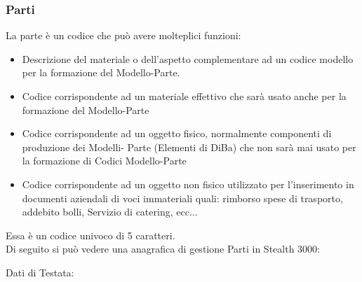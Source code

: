 \subsubsection{Parti}
La parte è un codice che può avere molteplici funzioni:
\begin{itemize}
\item Descrizione del materiale o dell’aspetto complementare ad un codice modello per la formazione del Modello-Parte.

\item Codice corrispondente ad un materiale effettivo che sarà usato anche per la formazione del Modello-Parte

\item Codice corrispondente ad un oggetto fisico, normalmente componenti di produzione dei Modelli- Parte (Elementi di DiBa) che non sarà mai usato per la formazione di Codici Modello-Parte

\item Codice corrispondente ad un oggetto non fisico utilizzato per l’inserimento in documenti aziendali di voci immateriali quali: rimborso spese di trasporto, addebito bolli, Servizio di catering, ecc...
\end{itemize}
Essa è un codice univoco di 5 caratteri.\\
Di seguito si può vedere una anagrafica di gestione Parti in Stealth 3000:



Dati di Testata:


